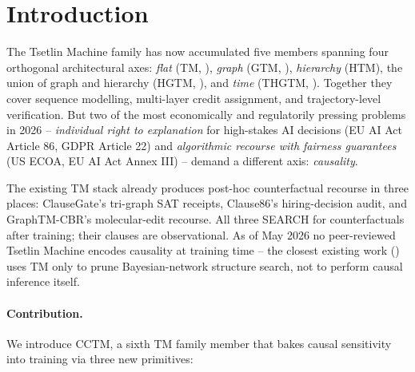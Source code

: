 \documentclass[11pt]{article}
\begin{document}
\section{Introduction}

The Tsetlin Machine family has now accumulated five members spanning four orthogonal architectural axes: \emph{flat} (TM, \citealp{granmo2018tsetlin}), \emph{graph} (GTM, \citealp{granmo2025graphtm}), \emph{hierarchy} (HTM), the union of graph and hierarchy (HGTM, \citealp{anwar2026hgtm}), and \emph{time} (THGTM, \citealp{anwar2026thgtm}).  Together they cover sequence modelling, multi-layer credit assignment, and trajectory-level verification.  But two of the most economically and regulatorily pressing problems in 2026 -- \emph{individual right to explanation} for high-stakes AI decisions (EU AI Act Article 86, GDPR Article 22) and \emph{algorithmic recourse with fairness guarantees} (US ECOA, EU AI Act Annex III) -- demand a different axis: \emph{causality}.

The existing TM stack already produces post-hoc counterfactual recourse in three places: ClauseGate's tri-graph SAT receipts, Clause86's hiring-decision audit, and GraphTM-CBR's molecular-edit recourse.  All three SEARCH for counterfactuals after training; their clauses are observational.  As of May 2026 no peer-reviewed Tsetlin Machine encodes causality at training time -- the closest existing work (\citealp{dumbre2025bnstructure}) uses TM only to prune Bayesian-network structure search, not to perform causal inference itself.

\paragraph{Contribution.}  We introduce CCTM, a sixth TM family member that bakes causal sensitivity into training via three new primitives:
\end{document}
